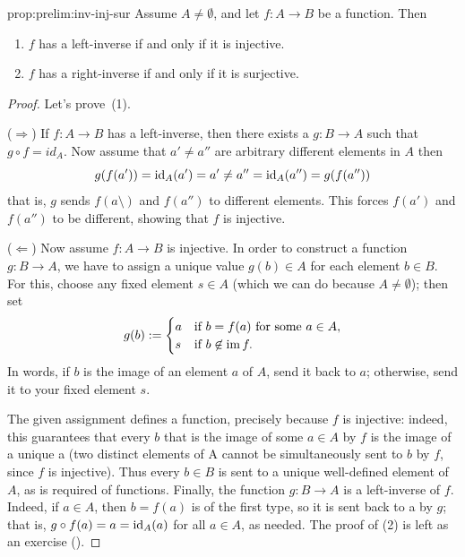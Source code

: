 \begin{prop}{}{prop:prelim:inv-inj-sur}
  Assume $A \ne\emptyset$, and let $f : A \to B$ be a function. Then
  \begin{enumerate}
  \item $f$ has a left-inverse if and only if it is injective.
  \item $f$ has a right-inverse if and only if it is surjective.
  \end{enumerate}
\end{prop}
\begin{proof} Let's prove~(1).
  
  ($\Rightarrow$) If $f : A \to B$ has a left-inverse, then there
  exists a $g : B \to A$ such that $g \circ f = id_A$. Now assume that
  $a' \ne a''$ are arbitrary different elements in $A$ then
  \[
    g(f(a')) = \operatorname{id}_A(a') = a' \ne a'' = \operatorname{id}_A(a'') = g(f(a''))
  \]
  that is, $g$ sends $f (a\setminus)$ and $f (a'' )$ to different
  elements. This forces $f (a')$ and $f (a'')$ to be different,
  showing that $f$ is injective.

  ($\Leftarrow$) Now assume $f : A \to B$ is injective. In order to
  construct a function $g : B \to A$, we have to assign a unique value
  $g(b) \in A$ for each element $b \in B$. For this, choose any fixed
  element $s \in A$ (which we can do because $A \ne \emptyset$); then
  set
  \[
    g(b) :=
    \begin{cases}
      a & \text{if } b = f(a) \text{ for some } a \in A,\\
      s & \text{if } b \not\in \operatorname{im} f.
    \end{cases}
  \]
  In words, if $b$ is the image of an element $a$ of $A$, send it back
  to $a$; otherwise, send it to your fixed element $s$.

  The given assignment defines a function, precisely because $f$ is
  injective: indeed, this guarantees that every $b$ that is the image
  of some $a \in A$ by $f$ is the image of a unique a (two distinct
  elements of A cannot be simultaneously sent to $b$ by $f$, since $f$
  is injective). Thus every $b \in B$ is sent to a unique well-defined
  element of $A$, as is required of functions.  Finally, the function
  $g : B \to A$ is a left-inverse of $f$. Indeed, if $a \in A$, then
  $b = f (a)$ is of the first type, so it is sent back to a by $g$;
  that is, $g \circ f(a) = a = \operatorname{id}_A(a)$ for all $a \in A$, as needed.
  The proof of (2) is left as an exercise
  ().
\end{proof}

